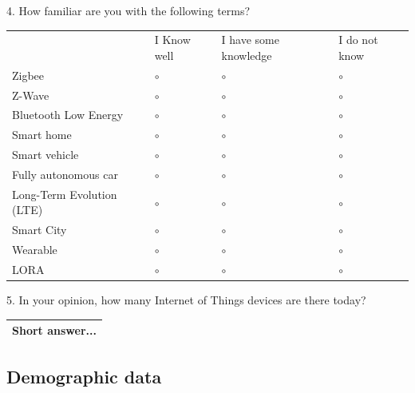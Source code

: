 4. How familiar are you with the following terms?

\vspace{0.6cm}
\begin{center}
    \noindent\begin{tabular}{ p{4.5cm} p{3cm} p{4cm} p{3cm} }
        & I Know well & I have some knowledge & I do not know \\[0.4cm]
        Zigbee & {\huge $\circ$} & {\huge $\circ$} & {\huge $\circ$} \\[0.2cm]
        Z-Wave & {\huge $\circ$} & {\huge $\circ$} & {\huge $\circ$} \\[0.2cm]
        Bluetooth Low Energy & {\huge $\circ$} & {\huge $\circ$} & {\huge $\circ$} \\[0.2cm]
        Smart home & {\huge $\circ$} & {\huge $\circ$} & {\huge $\circ$} \\[0.2cm]
        Smart vehicle & {\huge $\circ$} & {\huge $\circ$} & {\huge $\circ$} \\[0.2cm]
        Fully autonomous car & {\huge $\circ$} & {\huge $\circ$} & {\huge $\circ$} \\[0.2cm]
        Long-Term Evolution (LTE) & {\huge $\circ$} & {\huge $\circ$} & {\huge $\circ$} \\[0.2cm]
        Smart City & {\huge $\circ$} & {\huge $\circ$} & {\huge $\circ$} \\[0.2cm]
        Wearable & {\huge $\circ$} & {\huge $\circ$} & {\huge $\circ$} \\[0.2cm]
        LORA & {\huge $\circ$} & {\huge $\circ$} & {\huge $\circ$}
    \end{tabular}
\end{center}
\vspace{0.6cm}

5. In your opinion, how many Internet of Things devices are there today?

\vspace{0.6cm}
\begin{center}
    \noindent\begin{tabularx}{0.9\textwidth}{ |>{\raggedright\arraybackslash}X| }
        \hline
        \hspace{0.2cm}Short answer...\vspace{0.5cm} \\
        \hline
    \end{tabularx}
\end{center}
\vspace{0.6cm}

\subsection*{Demographic data}

